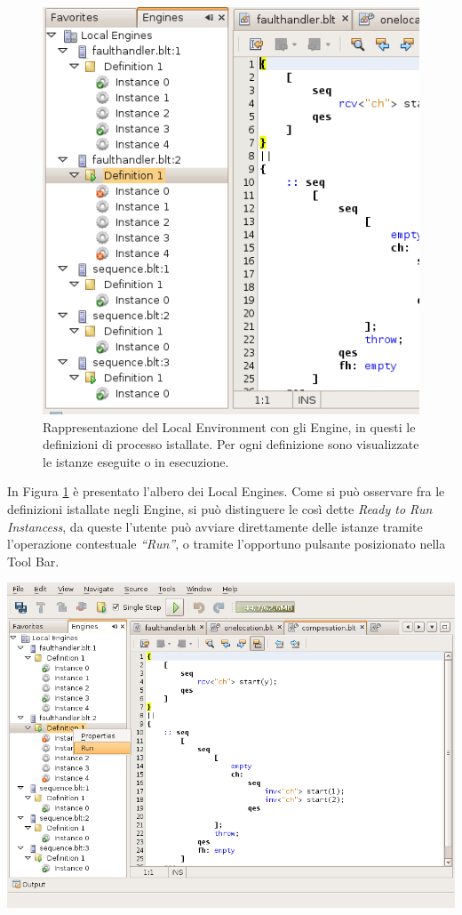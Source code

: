\begin{figure}[t]
\begin{center}
\includegraphics[scale=0.65]
{blide/dia/BlideEngines}
\caption[Blide, feedback alla compilazione]{Rappresentazione del Local
Environment con gli Engine, in questi le definizioni di processo istallate. Per
ogni definizione sono visualizzate le istanze eseguite o in esecuzione.}
  \label{fig:blidEngines}
\end{center}
\end{figure}

In Figura \ref{fig:blidEngines} è presentato l'albero dei Local Engines.
Come si può osservare fra le definizioni istallate negli Engine, si può
distinguere le così dette \emph{Ready to Run Instancess}, da queste l'utente
può avviare direttamente delle istanze tramite l'operazione contestuale
\emph{``Run''}, o tramite l'opportuno pulsante posizionato nella Tool Bar.

\begin{center}
\includegraphics[scale=0.65]{blide/dia/BlideRunInst}
\end{center}

